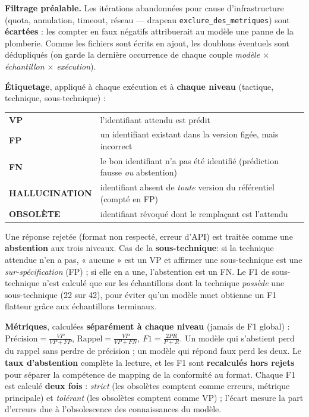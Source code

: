 \textbf{Filtrage préalable.} Les itérations abandonnées pour cause
d'infrastructure (quota, annulation, timeout, réseau — drapeau
\lstinline|exclure_des_metriques|) sont \textbf{écartées} : les compter en faux
négatifs attribuerait au modèle une panne de la plomberie. Comme les fichiers sont
écrits en ajout, les doublons éventuels sont dédupliqués (on garde la dernière
occurrence de chaque couple \emph{modèle $\times$ échantillon $\times$ exécution}).

\textbf{Étiquetage}, appliqué à chaque exécution et à \textbf{chaque niveau}
(tactique, technique, sous-technique) :
\begin{center}\small
\begin{tabular}{@{}ll@{}}
\toprule
\textbf{VP} & l'identifiant attendu est prédit \\
\textbf{FP} & un identifiant existant dans la version figée, mais incorrect \\
\textbf{FN} & le bon identifiant n'a pas été identifié (prédiction fausse \emph{ou} abstention) \\
\textbf{HALLUCINATION} & identifiant absent de \emph{toute} version du référentiel (compté en FP) \\
\textbf{OBSOLÈTE} & identifiant révoqué dont le remplaçant est l'attendu \\
\bottomrule
\end{tabular}
\end{center}

\noindent Une réponse rejetée (format non respecté, erreur d'API) est traitée
comme une \textbf{abstention} aux trois niveaux. Cas de la \textbf{sous-technique}:
si la technique attendue n'en a pas, « aucune » est un VP et affirmer une
sous-technique est une \emph{sur-spécification} (FP) ; si elle en a une,
l'abstention est un FN. Le F1 de sous-technique n'est calculé que sur les
échantillons dont la technique \emph{possède} une sous-technique (22 sur 42), pour
éviter qu'un modèle muet obtienne un F1 flatteur grâce aux échantillons terminaux.

\textbf{Métriques}, calculées \textbf{séparément à chaque niveau} (jamais de F1
global) : $\text{Précision}=\tfrac{VP}{VP+FP}$, $\text{Rappel}=\tfrac{VP}{VP+FN}$,
$F1=\tfrac{2PR}{P+R}$. Un modèle qui s'abstient perd du rappel sans perdre de
précision ; un modèle qui répond faux perd les deux. Le \textbf{taux d'abstention}
complète la lecture, et les F1 sont \textbf{recalculés hors rejets} pour séparer la
compétence de mapping de la conformité au format. Chaque F1 est calculé
\textbf{deux fois} : \emph{strict} (les obsolètes comptent comme erreurs, métrique
principale) et \emph{tolérant} (les obsolètes comptent comme VP) ; l'écart mesure
la part d'erreurs due à l'obsolescence des connaissances du modèle.

